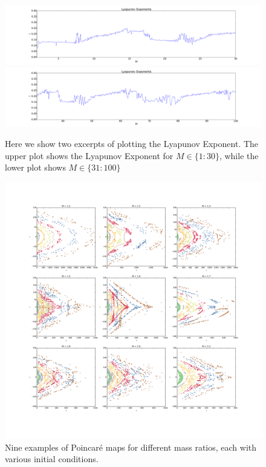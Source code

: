 \documentclass{article}
\begin{document}
\begin{figure}
\centering
\includegraphics[width=\textwidth]{Lyapunov_2_30}
\includegraphics[width=\textwidth]{Lyapunov_31_100}
\caption{Here we show two excerpts of plotting the Lyapunov Exponent.  The upper plot shows the Lyapunov Exponent for $M \in \{1:30\}$, while the lower plot shows $M \in \{31:100\}$}
\label{lyapunovs}
\end{figure} 

\begin{figure}
\centering
\includegraphics[width=\textwidth]{nine_plots}
\caption{Nine examples of Poincar\'e maps for different mass ratios, each with various initial conditions.}
\label{nine_plots}
\end{figure}
\end{document}
